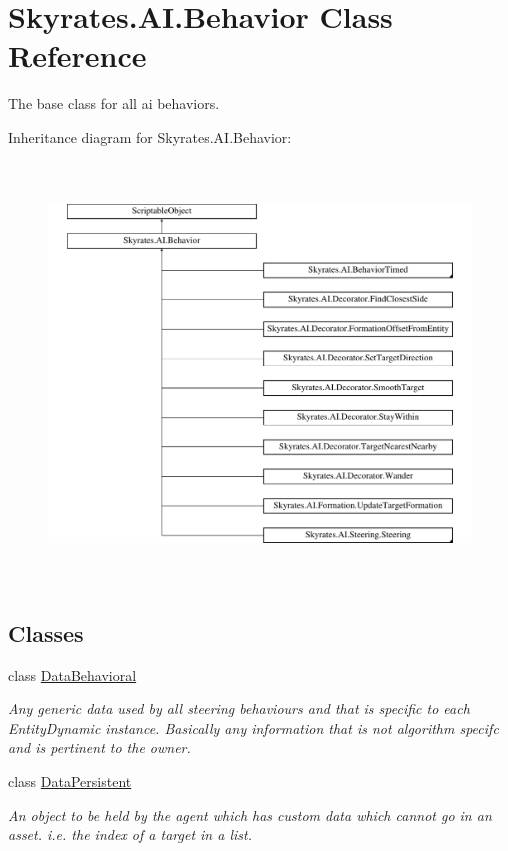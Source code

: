 \hypertarget{class_skyrates_1_1_a_i_1_1_behavior}{\section{Skyrates.\-A\-I.\-Behavior Class Reference}
\label{class_skyrates_1_1_a_i_1_1_behavior}
}


The base class for all ai behaviors.  


Inheritance diagram for Skyrates.\-A\-I.\-Behavior\-:\begin{figure}[H]
\begin{center}
\leavevmode
\includegraphics[height=11.200000cm]{class_skyrates_1_1_a_i_1_1_behavior}
\end{center}
\end{figure}
\subsection*{Classes}
\begin{DoxyCompactItemize}
\item 
class \hyperlink{class_skyrates_1_1_a_i_1_1_behavior_1_1_data_behavioral}{Data\-Behavioral}
\begin{DoxyCompactList}\small\item\em Any generic data used by all steering behaviours and that is specific to each Entity\-Dynamic instance. Basically any information that is not algorithm specifc and is pertinent to the owner. \end{DoxyCompactList}\item 
class \hyperlink{class_skyrates_1_1_a_i_1_1_behavior_1_1_data_persistent}{Data\-Persistent}
\begin{DoxyCompactList}\small\item\em An object to be held by the agent which has custom data which cannot go in an asset. i.\-e. the index of a target in a list. \end{DoxyCompactList}\end{DoxyCompactItemize}
